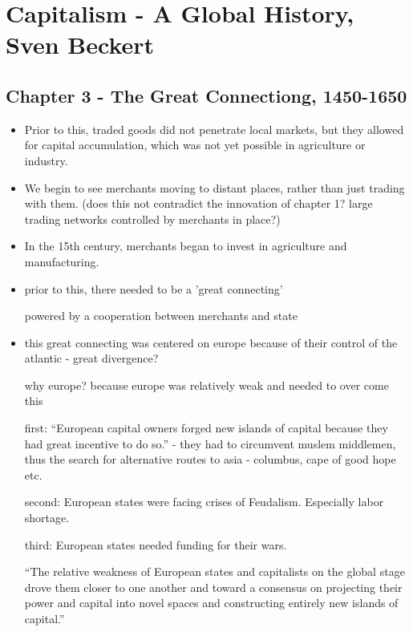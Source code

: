 \documentclass[a4paper,12pt]{article}
\begin{document}
\tableofcontents
\newpage

\section{Capitalism - A Global History, Sven Beckert}
\subsection{Chapter 3 - The Great Connectiong, 1450-1650}
\begin{itemize}
\item Prior to this, traded goods did not penetrate local markets, but they allowed for capital accumulation, which was not yet possible in agriculture or industry.

\item We begin to see merchants moving to distant places, rather than just trading with them. (does this not contradict the innovation of chapter 1? large trading networks controlled by merchants in place?)

\item In the 15th century, merchants began to invest in agriculture and manufacturing.

\item prior to this, there needed to be a 'great connecting'

\subitem powered by a cooperation between merchants and state

\item this great connecting was centered on europe because of their control of the atlantic - great divergence?

\subitem why europe? because europe was relatively weak and needed to over come this

\subitem first: ``European capital owners forged new islands of capital because they had great incentive to do so.'' - they had to circumvent muslem middlemen, thus the search for alternative routes to asia - columbus, cape of good hope etc.

\subitem second: European states were facing crises of Feudalism. Especially labor shortage.

\subitem third: European states needed funding for their wars.

\subitem ``The relative weakness of European states and capitalists on the global stage drove them closer to one another and toward a consensus on projecting their power and capital into novel spaces and constructing entirely new islands of capital.''


\end{itemize}
\end{document}
